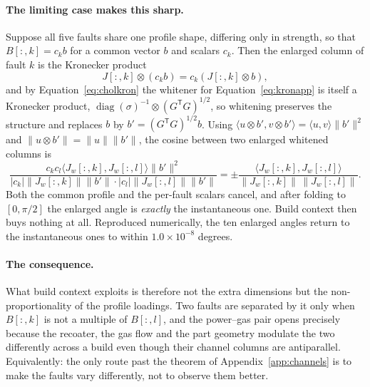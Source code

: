 \documentclass[preprint,12pt]{elsarticle}
\begin{document}
\paragraph{The limiting case makes this sharp.} Suppose all five faults share
one profile shape, differing only in strength, so that
$B[:,k] = c_k b$ for a common vector $b$ and scalars $c_k$. Then the enlarged
column of fault $k$ is the Kronecker product
%
\begin{equation}
J[:,k] \otimes (c_k b) = c_k \left( J[:,k] \otimes b \right),
\end{equation}
%
and by Equation~\eqref{eq:cholkron} the whitener for
Equation~\eqref{eq:kronapp} is itself a Kronecker product,
$\operatorname{diag}(\sigma)^{-1} \otimes (G^{\mathsf T}G)^{1/2}$, so whitening
preserves the structure and replaces $b$ by
$b' = (G^{\mathsf T}G)^{1/2} b$. Using
$\langle u \otimes b', v \otimes b' \rangle
 = \langle u, v \rangle \lVert b' \rVert^2$ and
$\lVert u \otimes b' \rVert = \lVert u \rVert \lVert b' \rVert$, the cosine
between two enlarged whitened columns is
%
\begin{equation}
\frac{c_k c_l \langle J_w[:,k], J_w[:,l] \rangle \lVert b' \rVert^2}
     {|c_k| \lVert J_w[:,k]\rVert \lVert b' \rVert \cdot
      |c_l| \lVert J_w[:,l]\rVert \lVert b' \rVert}
= \pm \frac{\langle J_w[:,k], J_w[:,l] \rangle}
          {\lVert J_w[:,k]\rVert \, \lVert J_w[:,l]\rVert} .
\end{equation}
%
Both the common profile and the per-fault scalars cancel, and after folding to
$[0, \pi/2]$ the enlarged angle is \emph{exactly} the instantaneous one. Build
context then buys nothing at all. Reproduced numerically, the ten enlarged
angles return to the instantaneous ones to within
$1.0 \times 10^{-8}$ degrees.

\paragraph{The consequence.} What build context exploits is therefore not the
extra dimensions but the non-proportionality of the profile loadings. Two
faults are separated by it only when $B[:,k]$ is not a multiple of $B[:,l]$, and
the power--gas pair opens precisely because the recoater, the gas flow and the
part geometry modulate the two differently across a build even though their
channel columns are antiparallel. Equivalently: the only route past the
theorem of Appendix~\ref{app:channels} is to make the faults vary differently,
not to observe them better.
\end{document}
